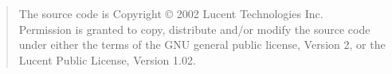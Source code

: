 \begin{quote}
The source code is Copyright \copyright{} 2002 Lucent Technologies Inc.\\
Permission is granted to copy, distribute and/or modify the source code
under either the terms of the GNU general public license, Version 2,
or the Lucent Public License, Version 1.02.
\end{quote}
